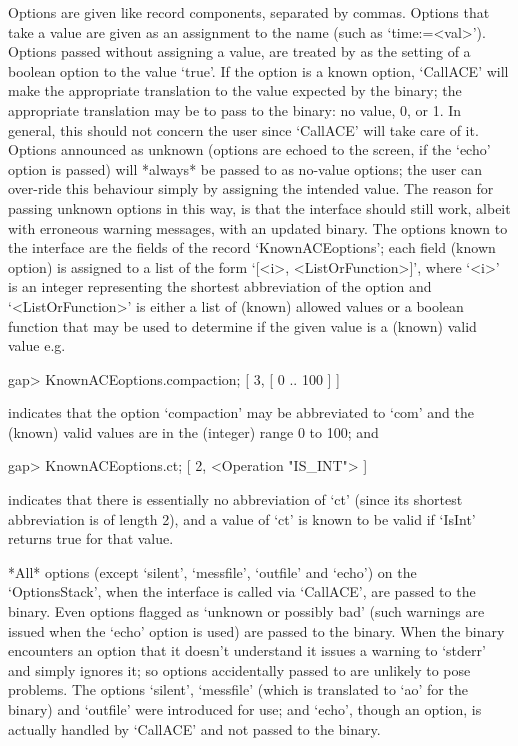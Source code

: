 Options are given like record components, separated by commas. Options
that take a value are given as an assignment  to  the  name  (such  as
`time:=<val>'). Options passed without assigning a value, are  treated
by {\GAP} as the setting of a boolean option to the value  `true'.  If
the  option  is  a  known  {\ACE}  option,  `CallACE'  will  make  the
appropriate translation to the value expected by  the  {\ACE}  binary;
the appropriate translation may be to pass to the binary: no value, 0,
or 1. In general, this should not concern  the  user  since  `CallACE'
will take care of it. Options announced as unknown (options are echoed
to the screen, if the `echo' option is passed) will *always* be passed
to {\ACE} as no-value options; the user can over-ride  this  behaviour
simply by assigning the intended value. The reason for passing unknown
options in this way, is that the {\ACE} interface should  still  work,
albeit with erroneous warning messages, with an  updated  binary.  The
{\ACE} options known to the {\ACE} interface are  the  fields  of  the
record `KnownACEoptions'; each field (known {\ACE} option) is assigned
to a list of the form `[<i>, <ListOrFunction>]',  where  `<i>'  is  an
integer representing the  shortest  abbreviation  of  the  option  and
`<ListOrFunction>' is either a list of (known)  allowed  values  or  a
boolean function that may be used to determine if the given value is a
(known) valid value e.g.

\begintt
gap> KnownACEoptions.compaction;
[ 3, [ 0 .. 100 ] ]
\endtt

indicates that the option `compaction' may be  abbreviated  to  `com'
and the (known) valid values are in the (integer) range 0 to 100; and

\begintt
gap> KnownACEoptions.ct;
[ 2, <Operation "IS_INT"> ]
\endtt

indicates that there is essentially no abbreviation of `ct' (since its
shortest abbreviation is of length 2),  and a value of  `ct' is  known
to be valid if `IsInt' returns true for that value.

*All* options (except `silent', `messfile', `outfile' and  `echo')  on
the `OptionsStack', when the {\ACE} interface is called via `CallACE',
are passed to the {\ACE} binary. Even options flagged as  \lq{}unknown
or possibly bad' (such warnings are issued when the `echo'  option  is
used) are  passed  to  the  {\ACE}  binary.  When  the  {\ACE}  binary
encounters an option that it doesn't understand it issues a warning to
`stderr' and simply ignores it;  so  options  accidentally  passed  to
{\ACE} are unlikely to pose problems. The options `silent', `messfile'
(which is translated to  `ao'  for  the  binary)  and  `outfile'  were
introduced for {\GAP} use; and `echo', though  an  {\ACE}  option,  is
actually handled by `CallACE' and not passed to the binary.


